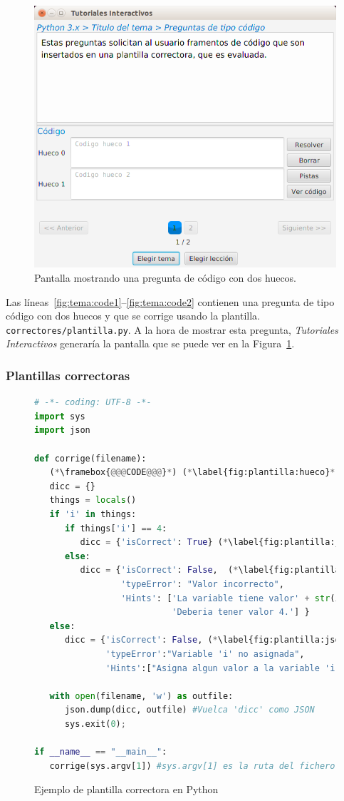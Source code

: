 \documentclass[]{article}
\newcommand{\code}[1]{{\lstinline[basicstyle=\ttfamily,mathescape]!#1!}}
\newcommand{\toolname}{\emph{Tutoriales Interactivos}}
\begin{document}
\begin{figure}[tb]
	\centerline{\includegraphics[scale=0.5]{codigo}}
	\caption{Pantalla mostrando una pregunta de código con dos huecos.\label{fig:codigo}}
\end{figure}

Las líneas~\ref{fig:tema:code1}--\ref{fig:tema:code2} contienen una pregunta de tipo código con dos huecos y que se corrige usando la plantilla. \code{correctores/plantilla.py}. A la hora de mostrar esta pregunta, \toolname{} generaría la pantalla que se puede ver en la Figura~\ref{fig:codigo}.

\subsubsection{Plantillas correctoras}\label{sec:plantillas}
\begin{figure}[tb]
\begin{lstlisting}[language=Python,basicstyle=\ttfamily, otherkeywords={with}]
# -*- coding: UTF-8 -*-
import sys
import json
	
def corrige(filename):
   (*\framebox{@@@CODE@@@}*) (*\label{fig:plantilla:hueco}*)
   dicc = {}
   things = locals()
   if 'i' in things:
      if things['i'] == 4:
         dicc = {'isCorrect': True} (*\label{fig:plantilla:json1}*)
      else:
         dicc = {'isCorrect': False,  (*\label{fig:plantilla:json2}*)
                 'typeError': "Valor incorrecto", 
                 'Hints': ['La variable tiene valor' + str(i),
                           'Deberia tener valor 4.'] }
   else:
      dicc = {'isCorrect': False, (*\label{fig:plantilla:json3}*)
              'typeError':"Variable 'i' no asignada", 
              'Hints':["Asigna algun valor a la variable 'i'"]}
	
   with open(filename, 'w') as outfile:
      json.dump(dicc, outfile) #Vuelca 'dicc' como JSON
      sys.exit(0);    
	
if __name__ == "__main__":
   corrige(sys.argv[1]) #sys.argv[1] es la ruta del fichero JSON
\end{lstlisting}	
\caption{Ejemplo de plantilla correctora en Python\label{fig:plantilla}}
\end{figure}
\end{document}
